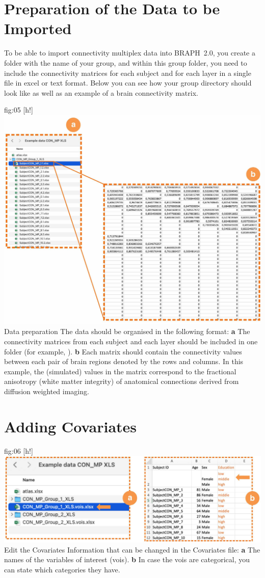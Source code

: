 \documentclass[justified]{tufte-handout}
\begin{document}
\clearpage
\section{Preparation of the Data to be Imported}

To be able to import connectivity multiplex data into BRAPH~2.0, you create a folder with the name of your group, and within this group folder, you need to include the connectivity matrices for each subject and for each layer in a single file in excel or text format. Below you can see how your group directory should look like as well as an example of a brain connectivity matrix.

	{fig:05}
	{
	[h!]
	\includegraphics{fig05.jpg}
	}
	{Data preparation}
	{
	The data should be organised in the following format:
	{\bf a} The connectivity matrices from each subject and each layer should be included in one folder (for example, ). 
	{\bf b} Each matrix should contain the connectivity values between each pair of brain regions denoted by the rows and columns. In this example, the (simulated) values in the matrix correspond to the fractional anisotropy (white matter integrity) of anatomical connections derived from diffusion weighted imaging.
	} 

\section{Adding Covariates}

	{fig:06}
	{
	[h!]
	\includegraphics{fig06.jpg}
	}
	{Edit the Covariates}
	{
	Information that can be changed in the Covariates file: 
	{\bf a} The names of the variables of interest (vois).
	{\bf b} In case the vois are categorical, you can state which categories they have.
	}
	
\end{document}
